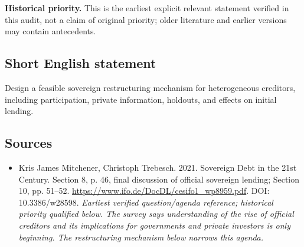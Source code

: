 \documentclass[11pt]{article}
\begin{document}
\par\textbf{Historical priority.} This is the earliest explicit relevant statement verified in this audit, not a claim of original priority; older literature and earlier versions may contain antecedents.

\subsection{Short English statement}
Design a feasible sovereign restructuring mechanism for heterogeneous creditors, including participation, private information, holdouts, and effects on initial lending.

\subsection{Sources}
\begin{itemize}\raggedright
\item[\textnormal{[S1]}]\hypertarget{source:30007537:1}{} Kris James Mitchener, Christoph Trebesch. 2021. Sovereign Debt in the 21st Century. Section 8, p. 46, final discussion of official sovereign lending; Section 10, pp. 51–52.
\url{https://www.ifo.de/DocDL/cesifo1_wp8959.pdf}.
DOI: 10.3386/w28598.
{\small\textit{Earliest verified question/agenda reference; historical priority qualified below. The survey says understanding of the rise of official creditors and its implications for governments and private investors is only beginning. The restructuring mechanism below narrows this agenda.}}
\end{itemize}
\end{document}
